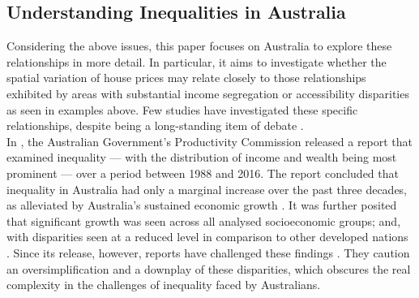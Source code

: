 \subsection{Understanding Inequalities in Australia}
\label{sec:australia}

Considering the above issues, this paper focuses on Australia to explore these relationships in more detail. In particular, it aims to investigate whether the spatial variation of house prices may relate closely to those relationships exhibited by areas with substantial income segregation or accessibility disparities as seen in examples above. Few studies have investigated these specific relationships, despite being a long-standing item of debate \citep{davidson2018inequality}. \\

In \citeyear{australian2018rising}, the Australian Government's Productivity Commission released a report that examined inequality --- with the distribution of income and wealth being most prominent --- over a period between 1988 and 2016. The report concluded that inequality in Australia had only a marginal increase over the past three decades, as alleviated by Australia's sustained economic growth \citep{australian2018rising}. It was further posited that significant growth was seen across all analysed socioeconomic groups; and, with disparities seen at a reduced level in comparison to other developed nations \citep{australian2018rising}. Since its release, however, reports have challenged these findings \citep{davidson2018inequality, sila2019income,wiesel_2020}. They caution an oversimplification and a downplay of these disparities, which obscures the real complexity in the challenges of inequality faced by Australians. \\

